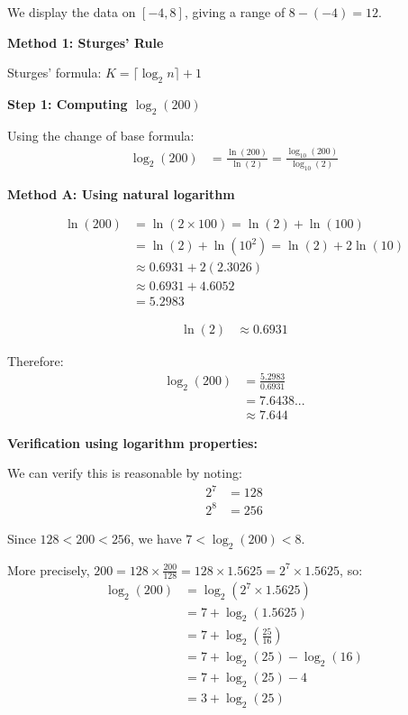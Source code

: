 \documentclass[12pt]{article}
\begin{document}
\begin{solution}
We display the data on \([-4, 8]\), giving a range of \(8 - (-4) = 12\).

\textbf{Method 1: Sturges' Rule}

Sturges' formula: \(K = \lceil \log_2 n \rceil + 1\)

\textbf{Step 1: Computing \(\log_2(200)\)}

Using the change of base formula:
\begin{align*}
\log_2(200) &= \frac{\ln(200)}{\ln(2)} = \frac{\log_{10}(200)}{\log_{10}(2)}
\end{align*}

\textbf{Method A: Using natural logarithm}

\begin{align*}
\ln(200) &= \ln(2 \times 100) = \ln(2) + \ln(100) \\
&= \ln(2) + \ln(10^2) = \ln(2) + 2\ln(10) \\
&\approx 0.6931 + 2(2.3026) \\
&\approx 0.6931 + 4.6052 \\
&= 5.2983
\end{align*}

\begin{align*}
\ln(2) &\approx 0.6931
\end{align*}

Therefore:
\begin{align*}
\log_2(200) &= \frac{5.2983}{0.6931} \\
&= 7.6438... \\
&\approx 7.644
\end{align*}

\textbf{Verification using logarithm properties:}

We can verify this is reasonable by noting:
\begin{align*}
2^7 &= 128 \\
2^8 &= 256
\end{align*}

Since \(128 < 200 < 256\), we have \(7 < \log_2(200) < 8\).

More precisely, \(200 = 128 \times \frac{200}{128} = 128 \times 1.5625 = 2^7 \times 1.5625\), so:
\begin{align*}
\log_2(200) &= \log_2(2^7 \times 1.5625) \\
&= 7 + \log_2(1.5625) \\
&= 7 + \log_2\left(\frac{25}{16}\right) \\
&= 7 + \log_2(25) - \log_2(16) \\
&= 7 + \log_2(25) - 4 \\
&= 3 + \log_2(25)
\end{align*}


\end{solution}
\end{document}
